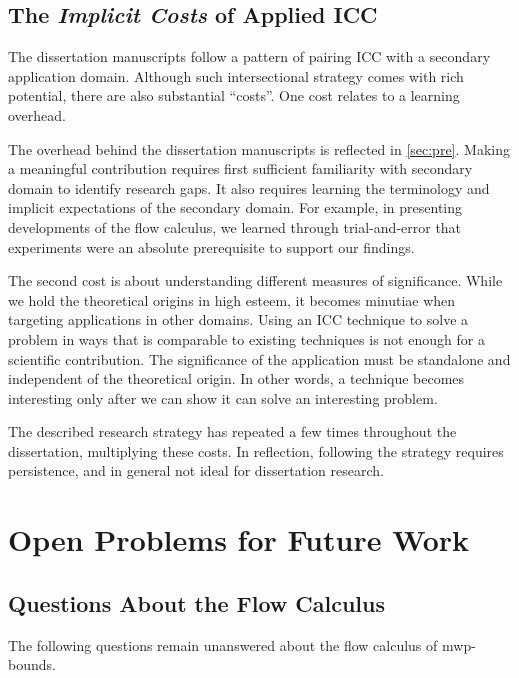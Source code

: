 \subsection{The \emph{Implicit Costs} of Applied ICC}
\label{subsec:res-meta}

The dissertation manuscripts follow a pattern of pairing ICC with a secondary application domain.
Although such intersectional strategy comes with rich potential, there are also substantial \enquote{costs}.
One cost relates to a learning overhead.

The overhead behind the dissertation manuscripts is reflected in \autoref{sec:pre}.
Making a meaningful contribution requires first sufficient familiarity with secondary domain to identify research gaps.
It also requires learning the terminology and implicit expectations of the secondary domain.
For example, in presenting developments of the flow calculus, we learned through trial-and-error that experiments were an absolute prerequisite to support our findings.

The second cost is about understanding different measures of significance.
While we hold the theoretical origins in high esteem, it becomes minutiae when targeting applications in other domains.
Using an ICC technique to solve a problem in ways that is comparable to existing techniques is not enough for a scientific contribution.
The significance of the application must be standalone and independent of the theoretical origin.
In other words, a technique becomes interesting only after we can show it can solve an interesting problem.

The described research strategy has repeated a few times throughout the dissertation, multiplying these costs.
In reflection, following the strategy requires persistence, and in general not ideal for dissertation research.

\section{Open Problems for Future Work}
\label{sec:res-future}

\subsection{Questions About the Flow Calculus}
\label{ssec:mwp-open}

The following questions remain unanswered about the flow calculus of
mwp-bounds.

